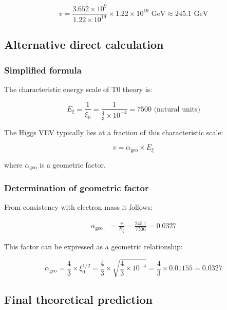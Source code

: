\documentclass[12pt,a4paper]{report}
\begin{document}
\begin{equation}
	v = \frac{3.652 \times 10^9}{1.22 \times 10^{19}} \times 1.22 \times 10^{19} \text{ GeV} \approx 245.1 \text{ GeV}
\end{equation}

\subsection{Alternative direct calculation}

\subsubsection{Simplified formula}

The characteristic energy scale of T0 theory is:

\begin{equation}
	E_\xi = \frac{1}{\xi_0} = \frac{1}{\frac{4}{3} \times 10^{-4}} = 7500 \text{ (natural units)}
\end{equation}

The Higgs VEV typically lies at a fraction of this characteristic scale:

\begin{equation}
	v = \alpha_{\text{geo}} \times E_\xi
\end{equation}

where $\alpha_{\text{geo}}$ is a geometric factor.

\subsubsection{Determination of geometric factor}

From consistency with electron mass it follows:

\begin{align}
	\alpha_{\text{geo}} &= \frac{v}{E_\xi} = \frac{245.1}{7500} = 0.0327
\end{align}

This factor can be expressed as a geometric relationship:

\begin{equation}
	\alpha_{\text{geo}} = \frac{4}{3} \times \xi_0^{1/2} = \frac{4}{3} \times \sqrt{\frac{4}{3} \times 10^{-4}} = \frac{4}{3} \times 0.01155 = 0.0327
\end{equation}

\subsection{Final theoretical prediction}
\end{document}

